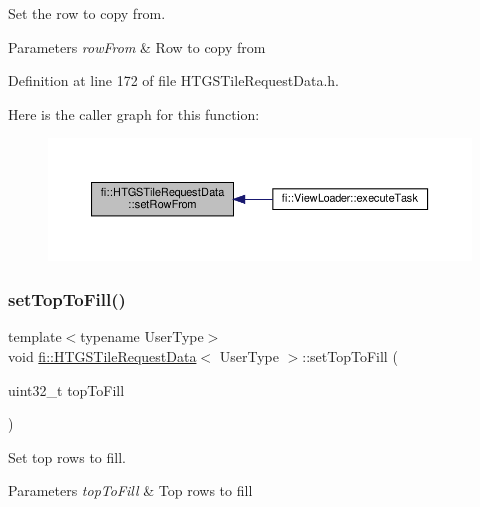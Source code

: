 Set the row to copy from. 


\begin{DoxyParams}{Parameters}
{\em row\+From} & Row to copy from \\
\hline
\end{DoxyParams}


Definition at line 172 of file H\+T\+G\+S\+Tile\+Request\+Data.\+h.

Here is the caller graph for this function\+:
\nopagebreak
\begin{figure}[H]
\begin{center}
\leavevmode
\includegraphics[width=350pt]{d6/d08/classfi_1_1HTGSTileRequestData_af601174888d365c99f2e0c4ef43ce19d_icgraph}
\end{center}
\end{figure}
\mbox{\label{classfi_1_1HTGSTileRequestData_a5852acce6bcabefdd82db8ac337ef2d0}} 
\subsubsection{\texorpdfstring{set\+Top\+To\+Fill()}{setTopToFill()}}
{\footnotesize\ttfamily template$<$typename User\+Type$>$ \\
void \hyperlink{classfi_1_1HTGSTileRequestData}{fi\+::\+H\+T\+G\+S\+Tile\+Request\+Data}$<$ User\+Type $>$\+::set\+Top\+To\+Fill (\begin{DoxyParamCaption}\item[{uint32\+\_\+t}]{top\+To\+Fill }\end{DoxyParamCaption})\hspace{0.3cm}{\ttfamily [inline]}}



Set top rows to fill. 


\begin{DoxyParams}{Parameters}
{\em top\+To\+Fill} & Top rows to fill \\
\hline
\end{DoxyParams}


